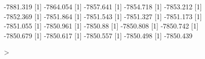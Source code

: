\begin{figure}
\begin{Schunk}
\begin{Soutput}
[1] -7881.319
[1] -7864.054
[1] -7857.641
[1] -7854.718
[1] -7853.212
[1] -7852.369
[1] -7851.864
[1] -7851.543
[1] -7851.327
[1] -7851.173
[1] -7851.055
[1] -7850.961
[1] -7850.88
[1] -7850.808
[1] -7850.742
[1] -7850.679
[1] -7850.617
[1] -7850.557
[1] -7850.498
[1] -7850.439
\end{Soutput}
\begin{Sinput}
> 
\end{Sinput}
\end{Schunk}
\end{figure}



